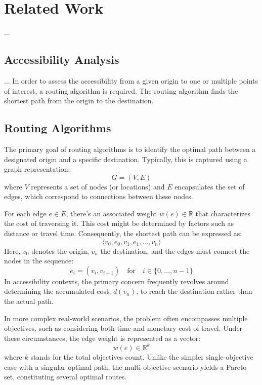 \clearpage
\section{Related Work}
\label{sec:related_work}

...

\subsection{Accessibility Analysis}
\label{subsec:accessibility_analysis}


...
In order to assess the accessibility from a given origin to one or multiple
points of interest, a routing algorithm is required. The routing algorithm finds
the shortest path from the origin to the destination.

\subsection{Routing Algorithms}
\label{subsec:routing_algorithms}

The primary goal of routing algorithms is to identify the optimal path between a designated origin and a specific destination.
Typically, this is captured using a graph representation:
\[ G = (V, E) \]
where $V$ represents a set of nodes (or locations) and $E$ encapsulates the set of edges, which correspond to connections between these nodes.

For each edge \( e \in E \), there's an associated weight \( w(e) \in \mathbb{R} \) that characterizes the cost of traversing it.
This cost might be determined by factors such as distance or travel time.
Consequently, the shortest path can be expressed as:
\[ \langle v_0, e_0, v_1, e_1, \dots, v_n \rangle \]
Here, \( v_0 \) denotes the origin, \( v_n \) the destination, and the edges must connect the nodes in the sequence:
\[ e_i = (v_i, v_{i+1}) \quad \text{for} \quad i \in \{0, \dots, n-1\} \]
In accessibility contexts, the primary concern frequently revolves around determining the accumulated cost, \( d(v_n) \), to reach the destination rather than the actual path.

In more complex real-world scenarios, the problem often encompasses multiple objectives, such as considering both time and monetary cost of travel.
Under these circumstances, the edge weight is represented as a vector:
\[ w(e) \in \mathbb{R}^k \]
where \( k \) stands for the total objectives count.
Unlike the simpler single-objective case with a singular optimal path, the multi-objective scenario yields a Pareto set, constituting several optimal routes.

